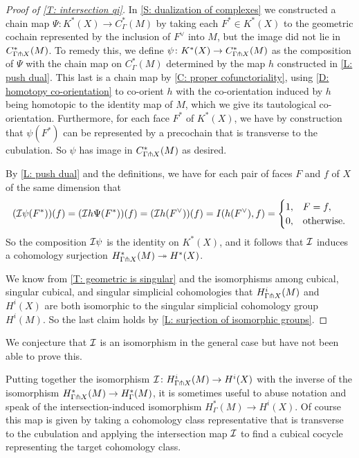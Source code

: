 \begin{proof}[Proof of \cref{T: intersection qi}]
	In \cref{S: dualization of complexes} we constructed a chain map $\Psi \colon K^*(X) \to C_\Gamma^*(M)$ by taking each $F^* \in K^*(X)$ to the geometric cochain represented by the inclusion of $F^\vee$ into $M$, but the image did not lie in $C^*_{\Gamma \pitchfork X}(M)$.
	To remedy this, we define $\psi \colon K^*(X) \to C_{\Gamma \pitchfork X}^*(M)$ as the composition of $\Psi$ with the chain map on $C^*_{\Gamma}(M)$ determined by the map $h$ constructed in \cref{L: push dual}.
	This last is a chain map by \cref{C: proper cofunctoriality}, using \cref{D: homotopy co-orientation} to co-orient $h$ with the co-orientation induced by $h$ being homotopic to the identity map of $M$, which we give its tautological co-orientation.
	Furthermore, for each face $F^*$ of $K^*(X)$, we have by construction that $\psi(F^*)$ can be represented by a precochain that is transverse to the cubulation.
	So $\psi$ has image in $C_{\Gamma \pitchfork X}^*(M)$ as desired.

	By \cref{L: push dual} and the definitions, we have for each pair of faces $F$ and $f$ of $X$ of the same dimension that
	\begin{equation*}
		(\mathcal{I} \psi(F^*))(f) = (\mathcal{I} h \Psi(F^*))(f)\\
		= (\mathcal{I} h (F^\vee))(f)\\
		= I( h (F^\vee) , f) \\
		=
		\begin{cases}
			1, & F=f,\\
			0, & \text{otherwise.}
		\end{cases}
	\end{equation*}
	So the composition $\mathcal{I} \psi$ is the identity on $K^*(X)$, and it follows that $\mathcal{I}$ induces a cohomology surjection $H^*_{\Gamma \pitchfork X}(M)\twoheadrightarrow H^*(X)$.

	We know from \cref{T: geometric is singular} and the isomorphisms among cubical, singular cubical, and singular simplicial cohomologies that $H^i_{\Gamma \pitchfork X}(M)$ and $H^i(X)$ are both isomorphic to the singular simplicial cohomology group $H^i(M)$.
	So the last claim holds by \cref{L: surjection of isomorphic groups}.
\end{proof}

We conjecture that $\mathcal{I}$ is an isomorphism in the general case but have not been able to prove this.

\begin{remark}\label{R: intersection map extension}
	Putting together the isomorphism $\mathcal{I} \colon H^i_{\Gamma \pitchfork X}(M) \to H^i(X)$ with the inverse of the isomorphism $H^*_{\Gamma \pitchfork X}(M) \to H^*_\Gamma(M)$, it is sometimes useful to abuse notation and speak of the intersection-induced isomorphism
	$H^*_\Gamma(M) \to H^i(X)$.
	Of course this map is given by taking a cohomology class representative that is transverse to the cubulation and applying the intersection map $\mathcal{I}$ to find a cubical cocycle representing the target cohomology class.
\end{remark}